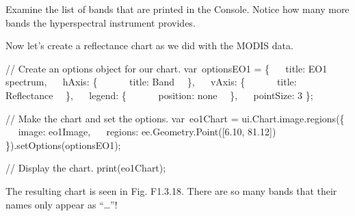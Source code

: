 \documentclass[
  letterpaper,
  DIV=11,
  numbers=noendperiod]{scrreprt}
\newenvironment{Shaded}{\begin{snugshade}}{\end{snugshade}}
\newcommand{\AttributeTok}[1]{\textcolor[rgb]{0.40,0.45,0.13}{#1}}
\newcommand{\CommentTok}[1]{\textcolor[rgb]{0.37,0.37,0.37}{#1}}
\newcommand{\DataTypeTok}[1]{\textcolor[rgb]{0.68,0.00,0.00}{#1}}
\newcommand{\DecValTok}[1]{\textcolor[rgb]{0.68,0.00,0.00}{#1}}
\newcommand{\FloatTok}[1]{\textcolor[rgb]{0.68,0.00,0.00}{#1}}
\newcommand{\FunctionTok}[1]{\textcolor[rgb]{0.28,0.35,0.67}{#1}}
\newcommand{\NormalTok}[1]{\textcolor[rgb]{0.00,0.23,0.31}{#1}}
\newcommand{\OperatorTok}[1]{\textcolor[rgb]{0.37,0.37,0.37}{#1}}
\newcommand{\StringTok}[1]{\textcolor[rgb]{0.13,0.47,0.30}{#1}}
\begin{document}
Examine the list of bands that are printed in the Console. Notice how
many more bands the hyperspectral instrument provides.

Now let's create a reflectance chart as we did with the MODIS data.

\begin{Shaded}
\begin{Highlighting}[]
\CommentTok{// Create an options object for our chart.  }
\NormalTok{var optionsEO1 }\OperatorTok{=}\NormalTok{ \{  }
  \DataTypeTok{ title}\OperatorTok{:} \StringTok{\textquotesingle{}EO1 spectrum\textquotesingle{}}\OperatorTok{,}  
  \DataTypeTok{ hAxis}\OperatorTok{:}\NormalTok{ \{  }
      \DataTypeTok{ title}\OperatorTok{:} \StringTok{\textquotesingle{}Band\textquotesingle{}}\NormalTok{   \}}\OperatorTok{,}  
  \DataTypeTok{ vAxis}\OperatorTok{:}\NormalTok{ \{  }
      \DataTypeTok{ title}\OperatorTok{:} \StringTok{\textquotesingle{}Reflectance\textquotesingle{}}\NormalTok{   \}}\OperatorTok{,}  
  \DataTypeTok{ legend}\OperatorTok{:}\NormalTok{ \{  }
      \DataTypeTok{ position}\OperatorTok{:} \StringTok{\textquotesingle{}none\textquotesingle{}}\NormalTok{   \}}\OperatorTok{,}  
  \DataTypeTok{ pointSize}\OperatorTok{:} \DecValTok{3}  
\NormalTok{\}}\OperatorTok{;}  
  
\CommentTok{// Make the chart and set the options.  }
\NormalTok{var eo1Chart }\OperatorTok{=}\NormalTok{ ui}\OperatorTok{.}\AttributeTok{Chart}\OperatorTok{.}\AttributeTok{image}\OperatorTok{.}\FunctionTok{regions}\NormalTok{(\{  }
  \DataTypeTok{ image}\OperatorTok{:}\NormalTok{ eo1Image}\OperatorTok{,}  
  \DataTypeTok{ regions}\OperatorTok{:}\NormalTok{ ee}\OperatorTok{.}\AttributeTok{Geometry}\OperatorTok{.}\FunctionTok{Point}\NormalTok{([}\FloatTok{6.10}\OperatorTok{,} \FloatTok{81.12}\NormalTok{])  }
\NormalTok{\})}\OperatorTok{.}\FunctionTok{setOptions}\NormalTok{(optionsEO1)}\OperatorTok{;}  
  
\CommentTok{// Display the chart.  }
\FunctionTok{print}\NormalTok{(eo1Chart)}\OperatorTok{;}
\end{Highlighting}
\end{Shaded}

The resulting chart is seen in Fig. F1.3.18. There are so many bands
that their names only appear as ``\ldots{}''!
\end{document}
